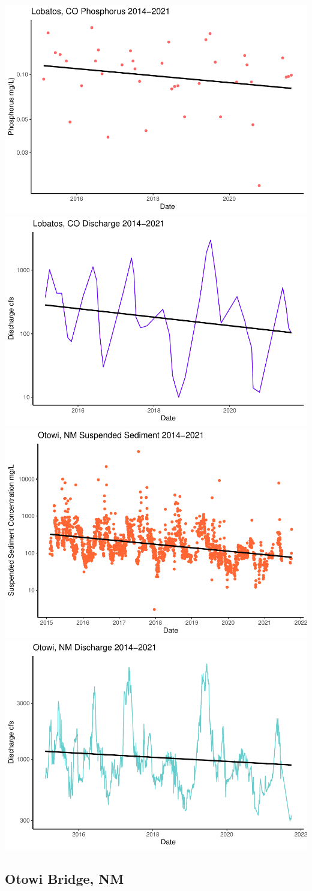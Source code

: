 \documentclass[
  12pt,
]{article}
\begin{document}
\includegraphics[width=0.5\linewidth]{Project_Template_files/figure-latex/2014-2021 looking at stream gauge data over time-1}
\includegraphics[width=0.5\linewidth]{Project_Template_files/figure-latex/2014-2021 looking at stream gauge data over time-2}
\includegraphics[width=0.5\linewidth]{Project_Template_files/figure-latex/2014-2021 looking at stream gauge data over time-3}
\includegraphics[width=0.5\linewidth]{Project_Template_files/figure-latex/2014-2021 looking at stream gauge data over time-4}

\hypertarget{otowi-bridge-nm}{%
\subsection{Otowi Bridge, NM}\label{otowi-bridge-nm}}
\end{document}

